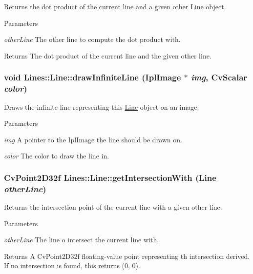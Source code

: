 Returns the dot product of the current line and a given other \hyperlink{classLines_1_1Line}{Line} object. 


\begin{DoxyParams}{Parameters}
\item[{\em otherLine}]The other line to compute the dot product with. \end{DoxyParams}
\begin{DoxyReturn}{Returns}
The dot product of the current line and the given other line. 
\end{DoxyReturn}
\hypertarget{classLines_1_1Line_aa8d3f21dec769723995171fca1794e23}{
\subsubsection[{drawInfiniteLine}]{\setlength{\rightskip}{0pt plus 5cm}void Lines::Line::drawInfiniteLine (IplImage $\ast$ {\em img}, \/  CvScalar {\em color})}}
\label{classLines_1_1Line_aa8d3f21dec769723995171fca1794e23}


Draws the infinite line representing this \hyperlink{classLines_1_1Line}{Line} object on an image. 


\begin{DoxyParams}{Parameters}
\item[{\em img}]A pointer to the IplImage the line should be drawn on. \item[{\em color}]The color to draw the line in. \end{DoxyParams}
\hypertarget{classLines_1_1Line_a791086d937b2c040f290575d3a6184fc}{
\subsubsection[{getIntersectionWith}]{\setlength{\rightskip}{0pt plus 5cm}CvPoint2D32f Lines::Line::getIntersectionWith ({\bf Line} {\em otherLine})}}
\label{classLines_1_1Line_a791086d937b2c040f290575d3a6184fc}


Returns the intersection point of the current line with a given other line. 


\begin{DoxyParams}{Parameters}
\item[{\em otherLine}]The line o intersect the current line with. \end{DoxyParams}
\begin{DoxyReturn}{Returns}
A CvPoint2D32f floating-\/value point representing th intersection derived. If no intersection is found, this returns (0, 0). 
\end{DoxyReturn}


